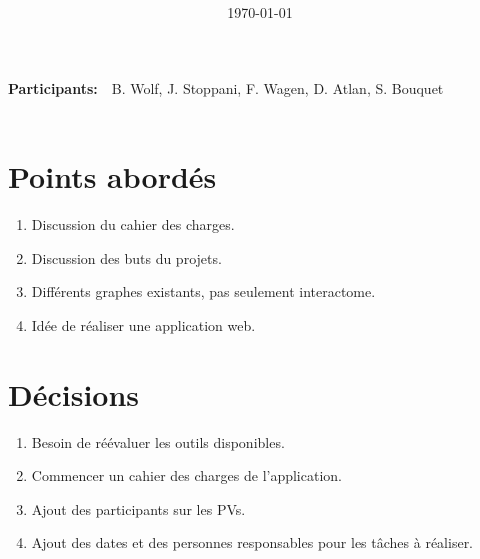 \documentclass{article}
\title{
\vspace{2in}
\textmd{\textbf{\hmwkTitle}}\\
\vspace{3in}
}
\author{\textbf{\hmwkAuthorName}}
\date{\today} %
\newcommand{\hmwkAuthorName}{S. Bouquet} %
\newcommand{\hLine}{\noindent\makebox[\linewidth]{\rule{\textwidth}{.1pt}} \\}
\begin{document}
\maketitle



 \newpage


\large\textbf{Participants:}\normalsize~~B. Wolf, J. Stoppani, F. Wagen, D. Atlan, \hmwkAuthorName\\
\hLine

\section{Points abordés}
\begin{enumerate}
  \item Discussion du cahier des charges.
  \item Discussion des buts du projets.
  \item Différents graphes existants, pas seulement interactome.
  \item Idée de réaliser une application web.
\end{enumerate}

\section{Décisions}
\begin{enumerate}
  \item Besoin de réévaluer les outils disponibles.
  \item Commencer un cahier des charges de l'application.
  \item Ajout des participants sur les PVs.
  \item Ajout des dates et des personnes responsables pour les tâches à réaliser.
\end{enumerate}
\end{document}
